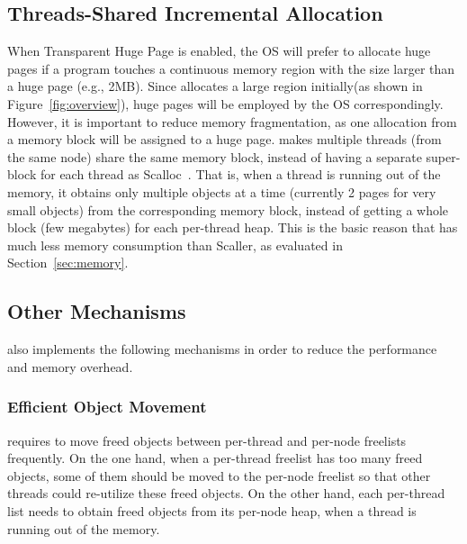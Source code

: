 \subsection{Threads-Shared Incremental Allocation} 
When Transparent Huge Page is enabled, the OS will prefer to allocate huge pages if a program touches a continuous memory region with the size larger than a huge page (e.g., 2MB). Since \NM{} allocates a large region initially(as shown in Figure~\ref{fig:overview}), huge pages will be employed by the OS correspondingly. However, it is important to reduce memory fragmentation, as one allocation from a memory block will be assigned to a huge page. \NM{} makes multiple threads (from the same node) share the same memory block, instead of having a separate super-block for each thread as Scalloc~\cite{Scalloc}. That is, when a thread is running out of the memory, it obtains only multiple objects at a time (currently 2 pages for very small objects) from the corresponding memory block, instead of getting a whole block (few megabytes) for each per-thread heap. This is the basic reason that \NM{} has much less memory consumption than Scaller, as evaluated in Section~\ref{sec:memory}.  

\subsection{Other Mechanisms}
\label{sec:others}

\NM{} also implements the following mechanisms in order to reduce the performance and memory overhead. 

\subsubsection{Efficient Object Movement} 
\NM{} requires to move freed objects between per-thread and per-node freelists frequently. On the one hand, when a per-thread freelist has too many freed objects, some of them should be moved to the per-node freelist so that other threads could re-utilize these freed objects. On the other hand, each per-thread list needs to obtain freed objects from its per-node heap, when a thread is running out of the memory. 


